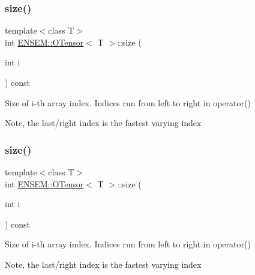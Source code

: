 \subsubsection{\texorpdfstring{size()}{size()}\hspace{0.1cm}{\footnotesize\ttfamily [2/6]}}
{\footnotesize\ttfamily template$<$class T$>$ \\
int \mbox{\hyperlink{classENSEM_1_1OTensor}{E\+N\+S\+E\+M\+::\+O\+Tensor}}$<$ T $>$\+::size (\begin{DoxyParamCaption}\item[{int}]{i }\end{DoxyParamCaption}) const\hspace{0.3cm}{\ttfamily [inline]}}



Size of i-\/th array index. Indices run from left to right in operator() 

Note, the last/right index is the fastest varying index \mbox{\label{classENSEM_1_1OTensor_aeb39779caeadcbcea94d9ef629913287}} 
\subsubsection{\texorpdfstring{size()}{size()}\hspace{0.1cm}{\footnotesize\ttfamily [3/6]}}
{\footnotesize\ttfamily template$<$class T$>$ \\
int \mbox{\hyperlink{classENSEM_1_1OTensor}{E\+N\+S\+E\+M\+::\+O\+Tensor}}$<$ T $>$\+::size (\begin{DoxyParamCaption}\item[{int}]{i }\end{DoxyParamCaption}) const\hspace{0.3cm}{\ttfamily [inline]}}



Size of i-\/th array index. Indices run from left to right in operator() 

Note, the last/right index is the fastest varying index \mbox{\label{classENSEM_1_1OTensor_aa34f5311f161a9b4aef0b08af6fb8d34}} 
